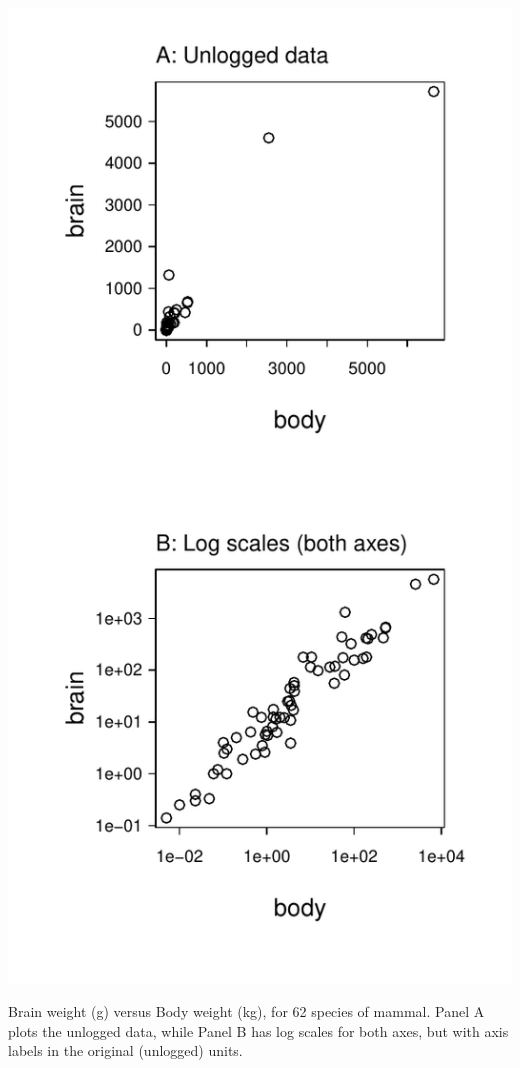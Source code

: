 \begin{marginfigure}
\begin{Schunk}


\centerline{\includegraphics[width=\textwidth]{figs/03-bbAB-1} }

\end{Schunk}
\caption{Brain weight (g) versus Body weight (kg), for 62 species of mammal.
Panel A plots the unlogged data, while Panel B has log scales for
both axes, but with axis labels in the original (unlogged) units.
  \label{fig:Animals}}
\end{marginfigure}

